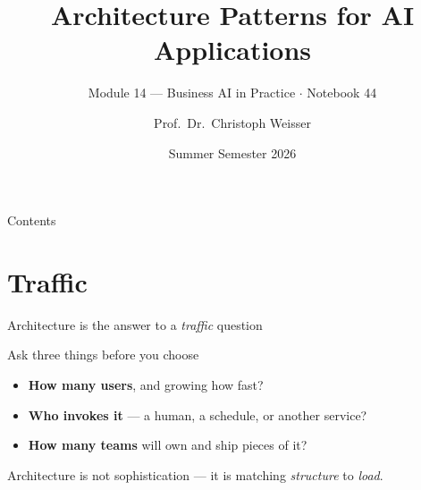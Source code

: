 \documentclass[aspectratio=169,11pt]{beamer}
\title{Architecture Patterns for AI Applications}
\subtitle{Module 14 --- Business AI in Practice $\cdot$ Notebook 44}
\author{Prof.\ Dr.\ Christoph Weisser}
\institute{HSBI}
\date{Summer Semester 2026}
\begin{document}
\begin{frame}\titlepage\end{frame}

\begin{frame}{Contents}
  \tableofcontents[hideallsubsections]
\end{frame}

\section{Traffic}
\begin{frame}{Architecture is the answer to a \emph{traffic} question}
  \begin{center}
  \end{center}
  \begin{block}{Ask three things before you choose}
    \begin{itemize}
      \item \textbf{How many users}, and growing how fast?
      \item \textbf{Who invokes it} --- a human, a schedule, or another service?
      \item \textbf{How many teams} will own and ship pieces of it?
    \end{itemize}
  \end{block}
  {\footnotesize Architecture is not sophistication --- it is matching \emph{structure} to \emph{load}.}
\end{frame}

\end{document}
